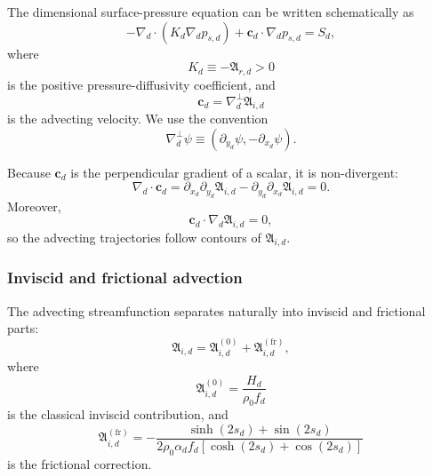 \documentclass[10pt]{amsart}
\begin{document}
The dimensional surface-pressure equation can be written schematically as
\begin{equation}
-\nabla_d\cdot
\left(
K_d\nabla_d p_{s,d}
\right)
+
\boldsymbol c_d\cdot\nabla_d p_{s,d}
=
S_d,
\end{equation}
where
\begin{equation}
K_d
\equiv
-\mathfrak A_{r,d}>0
\end{equation}
is the positive pressure-diffusivity coefficient, and
\begin{equation}
\boldsymbol c_d
=
\nabla_d^\perp\mathfrak A_{i,d}
\end{equation}
is the advecting velocity. We use the convention
\begin{equation}
\nabla_d^\perp\psi
\equiv
\left(
\partial_{y_d}\psi,
-\partial_{x_d}\psi
\right).
\end{equation}

Because \(\boldsymbol c_d\) is the perpendicular gradient of a scalar,
it is non-divergent:
\begin{equation}
\nabla_d\cdot\boldsymbol c_d
=
\partial_{x_d}\partial_{y_d}\mathfrak A_{i,d}
-
\partial_{y_d}\partial_{x_d}\mathfrak A_{i,d}
=
0.
\end{equation}
Moreover,
\begin{equation}
\boldsymbol c_d\cdot\nabla_d\mathfrak A_{i,d}=0,
\end{equation}
so the advecting trajectories follow contours of
\(\mathfrak A_{i,d}\).


\subsubsection{Inviscid and frictional advection}

The advecting streamfunction separates naturally into inviscid and
frictional parts:
\begin{equation}
\mathfrak A_{i,d}
=
\mathfrak A_{i,d}^{(0)}
+
\mathfrak A_{i,d}^{(\mathrm{fr})},
\end{equation}
where
\begin{equation}
\boxed{
\mathfrak A_{i,d}^{(0)}
=
\frac{H_d}{\rho_0f_d}
}
\end{equation}
is the classical inviscid contribution, and
\begin{equation}
\boxed{
\mathfrak A_{i,d}^{(\mathrm{fr})}
=
-
\frac{
\sinh(2s_d)+\sin(2s_d)
}{
2\rho_0\alpha_df_d
\left[
\cosh(2s_d)+\cos(2s_d)
\right]
}
}
\end{equation}
is the frictional correction.
\end{document}
